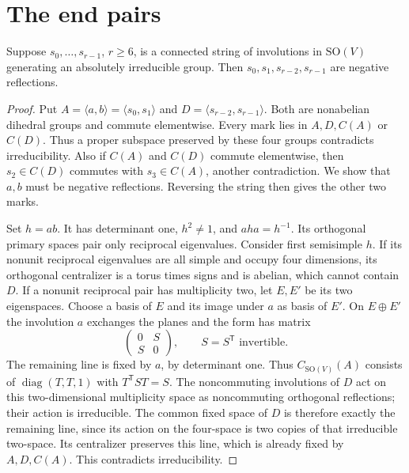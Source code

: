 \documentclass[11pt,a4paper]{article}
\newcommand{\gen}[1]{\langle#1\rangle}\newcommand{\Om}{\Omega}
\newcommand{\SO}{\mathrm{SO}}\newcommand{\F}{\mathbf F}
\begin{document}
\section{The end pairs}
\begin{lemma}\label{ends}
Suppose $s_0,\ldots,s_{r-1}$, $r\ge6$, is a connected string of
involutions in $\SO(V)$ generating an absolutely irreducible group.
Then $s_0,s_1,s_{r-2},s_{r-1}$ are negative reflections.
\end{lemma}
\begin{proof}
Put $A=\gen{a,b}=\gen{s_0,s_1}$ and
$D=\gen{s_{r-2},s_{r-1}}$. Both are nonabelian dihedral groups and
commute elementwise. Every mark lies in $A,D,C(A)$ or $C(D)$.
Thus a proper subspace preserved by these four groups contradicts
irreducibility. Also if $C(A)$ and $C(D)$ commute elementwise, then
$s_2\in C(D)$ commutes with $s_3\in C(A)$, another contradiction.
We show that $a,b$ must be negative reflections. Reversing the string
then gives the other two marks.

Set $h=ab$. It has determinant one, $h^2\ne1$, and $aha=h^{-1}$.
Its orthogonal primary spaces pair only reciprocal eigenvalues.
Consider first semisimple $h$. If its nonunit reciprocal eigenvalues
are all simple and occupy four dimensions, its orthogonal centralizer
is a torus times signs and is abelian, which cannot contain $D$.
If a nonunit reciprocal pair has multiplicity two, let $E,E'$ be its
two eigenspaces. Choose a basis of $E$ and its image under $a$ as
basis of $E'$. On $E\oplus E'$ the involution $a$ exchanges the
planes and the form has matrix
\[
                 \begin{pmatrix}0&S\\S&0\end{pmatrix},
                 \qquad S=S^{\mathsf T}\text{ invertible}.
\]
The remaining line is fixed by $a$, by determinant one. Thus
$C_{\SO(V)}(A)$ consists of $\operatorname{diag}(T,T,1)$ with
$T^{\mathsf T}ST=S$. The noncommuting involutions of $D$ act on this
two-dimensional multiplicity space as noncommuting orthogonal
reflections; their action is irreducible. The common fixed space of $D$ is
therefore exactly the remaining line, since its action on the four-space
is two copies of that irreducible two-space. Its centralizer preserves
this line, which is already fixed by $A,D,C(A)$. This contradicts
irreducibility.


\end{proof}
\end{document}
